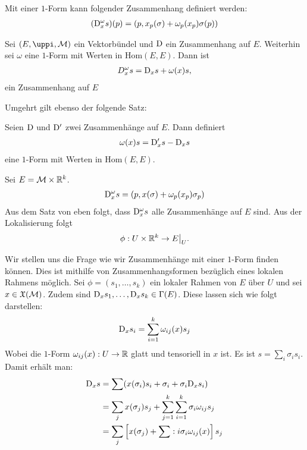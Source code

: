 \begin{defs}
Mit einer $1$-Form kann folgender Zusammenhang definiert werden:
\begin{align}
(\mathrm{D}^\omega_x s)(p) = (p, x_p(\sigma) + \omega_p(x_p) \sigma(p))
\end{align}
\end{defs}

\begin{satz}
\label{satz:zusammenhangausform}
Sei $(E, \pi, \mfk)$ ein Vektorbündel und $\mathrm{D}$ ein Zusammenhang auf $E$.
Weiterhin sei $\omega$ eine $1$-Form mit Werten in $\mathrm{Hom}(E, E)$.
Dann ist 
\begin{align}
D^\omega_x s = \mathrm{D}_x s + \omega(x) s,
\end{align}
ein Zusammenhang auf $E$
\end{satz}
Umgehrt gilt ebenso der folgende Satz:
\begin{satz}
Seien $\mathrm{D}$ und $\mathrm{D}'$ zwei Zusammenhänge auf $E$.
Dann definiert 
\begin{align}
\omega(x) s = \mathrm{D}'_x s - \mathrm{D}_x s
\end{align}
eine $1$-Form mit Werten in $\mathrm{Hom}(E, E)$.
\end{satz}
\begin{bsp}
Sei $E = \mathcal{M} \times \mathbb{R}^k$. 
\begin{align}
\mathrm{D}^\omega_x s = (p, x(\sigma) + \omega_p (x_p)\sigma_p)
\end{align}
Aus dem Satz von eben folgt, dass $\mathrm{D}^\omega_x s$ alle Zusammenhänge auf $E$ sind.
Aus der Lokalisierung folgt
\begin{align}
\phi : U \times \mathbb{R}^k \to E\big\vert_U.
\end{align}
\end{bsp}
Wir stellen uns die Frage wie wir Zusammenhänge mit einer $1$-Form finden können.
Dies ist mithilfe von Zusammenhangsformen bezüglich eines lokalen Rahmens möglich.
Sei $\phi = (s_1, \dots, s_k)$ ein lokaler Rahmen von $E$ über $U$ und sei $x \in \mathfrak{X}(\mathcal{M})$.
Zudem sind $\mathrm{D}_x s_1, \dots, \mathrm{D}_x s_k \in \Gamma(E)$.
Diese lassen sich wie folgt darstellen:
\begin{align}
\mathrm{D}_x s_i = \sum_{i=1}^k \omega_{ij}(x) s_j
\end{align}
Wobei die $1$-Form $\omega_{ij}(x): U \to \mathbb{R}$ glatt und tensoriell in $x$ ist.
Es ist $s = \sum_i \sigma_i s_i$. 
Damit erhält man:
\begin{align}
\mathrm{D}_x s &= \sum (x(\sigma_i)s_i + \sigma_i + \sigma_i \mathrm{D}_x s_i)\\
&= \sum_j x(\sigma_j)s_j + \sum_{j=1}^k \sum_{i=1}^k \sigma_i \omega_{ij} s_j\\
&= \sum_j \left[ x(\sigma_j) + \sum:i \sigma_i \omega_{ij}(x) \right] s_j
\end{align}


